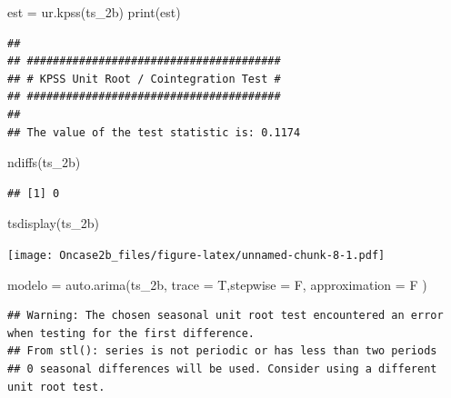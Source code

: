 \documentclass[
]{article}
\newenvironment{Shaded}{\begin{snugshade}}{\end{snugshade}}
\newcommand{\AttributeTok}[1]{\textcolor[rgb]{0.77,0.63,0.00}{#1}}
\newcommand{\FunctionTok}[1]{\textcolor[rgb]{0.00,0.00,0.00}{#1}}
\newcommand{\NormalTok}[1]{#1}
\newcommand{\OtherTok}[1]{\textcolor[rgb]{0.56,0.35,0.01}{#1}}
\begin{document}
\begin{Shaded}
\begin{Highlighting}[]
\NormalTok{est }\OtherTok{=} \FunctionTok{ur.kpss}\NormalTok{(ts\_2b)}
\FunctionTok{print}\NormalTok{(est)}
\end{Highlighting}
\end{Shaded}

\begin{verbatim}
## 
## ####################################### 
## # KPSS Unit Root / Cointegration Test # 
## ####################################### 
## 
## The value of the test statistic is: 0.1174
\end{verbatim}

\begin{Shaded}
\begin{Highlighting}[]
\FunctionTok{ndiffs}\NormalTok{(ts\_2b)}
\end{Highlighting}
\end{Shaded}

\begin{verbatim}
## [1] 0
\end{verbatim}

\begin{Shaded}
\begin{Highlighting}[]
\FunctionTok{tsdisplay}\NormalTok{(ts\_2b)}
\end{Highlighting}
\end{Shaded}

\texttt{[image: Oncase2b\_files/figure-latex/unnamed-chunk-8-1.pdf]}

\begin{Shaded}
\begin{Highlighting}[]
\NormalTok{modelo }\OtherTok{=} \FunctionTok{auto.arima}\NormalTok{(ts\_2b, }\AttributeTok{trace =}\NormalTok{ T,}\AttributeTok{stepwise =}\NormalTok{ F, }\AttributeTok{approximation =}\NormalTok{ F )}
\end{Highlighting}
\end{Shaded}

\begin{verbatim}
## Warning: The chosen seasonal unit root test encountered an error when testing for the first difference.
## From stl(): series is not periodic or has less than two periods
## 0 seasonal differences will be used. Consider using a different unit root test.
\end{verbatim}
\end{document}

